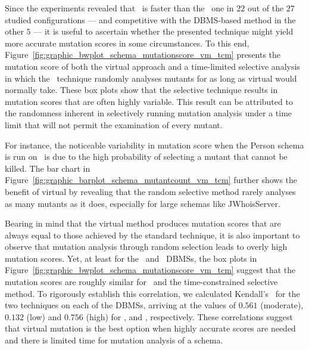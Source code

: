 


 Since the experiments revealed that \vma~is faster than the \Original~one in $22$ out of the $27$ studied configurations --- and competitive with the DBMS-based method in the other $5$ --- it is useful to ascertain whether the presented technique might yield more accurate mutation scores in some circumstances. To this end, Figure~\ref{fig:graphic_bwplot_schema_mutationscore_vm_tcm} presents the mutation score of both the virtual approach and a time-limited selective analysis in which the \Original~technique randomly analyses mutants for as long as virtual would normally take. These box plots show that the selective technique results in mutation scores that are often highly variable. This result can be attributed to the randomness inherent in selectively running mutation analysis under a time limit that will not permit the examination of every mutant.

%

For instance, the noticeable variability in mutation score when the Person schema is run on \Postgres~is due to the high probability of selecting a mutant that cannot be killed. The bar chart in Figure~\ref{fig:graphic_barplot_schema_mutantcount_vm_tcm} further shows the benefit of virtual by revealing that the random selective method rarely analyses as many mutants as it does, especially for large schemas like JWhoisServer.

Bearing in mind that the virtual method produces mutation scores that are always equal to those achieved by the standard
technique, it is also important to observe that mutation analysis through random selection leads to overly high mutation
scores.  Yet, at least for the \HyperSQL~and \SQLite~DBMSs, the box plots in
Figure~\ref{fig:graphic_bwplot_schema_mutationscore_vm_tcm} suggest that the mutation scores are roughly similar for
\vma~and the time-constrained selective method. To rigorously establish this correlation, we calculated Kendall's \taub~for the two techniques on each of the DBMSs, arriving at the values of $0.561$ (moderate), $0.132$ (low) and $0.756$ (high) for \HyperSQL, \PostgreSQL and \sqlite, respectively. These correlations suggest that virtual mutation is the best option when highly accurate scores are needed and there is limited time for mutation analysis of a schema.

